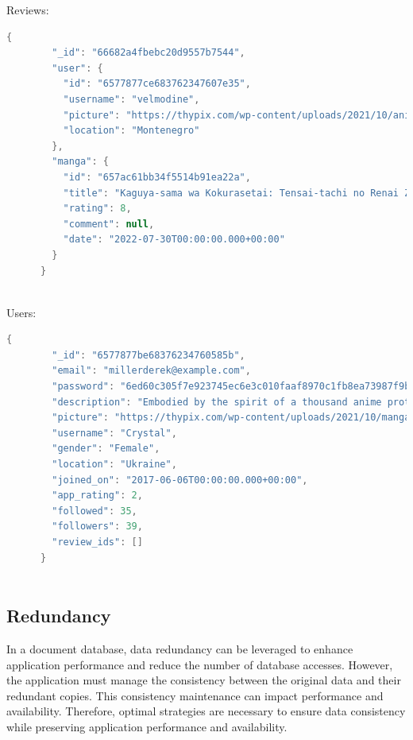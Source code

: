 \newpage

Reviews:
\begin{mdframed}[backgroundcolor=yellow!20, innerleftmargin=10pt, innerrightmargin=10pt]
    \begin{lstlisting}[language=java]
      {
        "_id": "66682a4fbebc20d9557b7544",
        "user": {
          "id": "6577877ce683762347607e35",
          "username": "velmodine",
          "picture": "https://thypix.com/wp-content/uploads/2021/10/anime-avatar-profile-pic...",
          "location": "Montenegro"
        },
        "manga": {
          "id": "657ac61bb34f5514b91ea22a",
          "title": "Kaguya-sama wa Kokurasetai: Tensai-tachi no Renai Zunousen",
          "rating": 8,
          "comment": null,
          "date": "2022-07-30T00:00:00.000+00:00"
        }
      }
      
    \end{lstlisting}
\end{mdframed}

Users:
\begin{mdframed}[backgroundcolor=yellow!20, innerleftmargin=10pt, innerrightmargin=10pt]
    \begin{lstlisting}[language=java]
      {
        "_id": "6577877be68376234760585b",
        "email": "millerderek@example.com",
        "password": "6ed60c305f7e923745ec6e3c010faaf8970c1fb8ea73987f9bf6d5ed053aa94c",
        "description": "Embodied by the spirit of a thousand anime protagonists.",
        "picture": "https://thypix.com/wp-content/uploads/2021/10/manga-profile-picture-82...",
        "username": "Crystal",
        "gender": "Female",
        "location": "Ukraine",
        "joined_on": "2017-06-06T00:00:00.000+00:00",
        "app_rating": 2,
        "followed": 35,
        "followers": 39,
        "review_ids": []
      }
      
    \end{lstlisting}
\end{mdframed}

\subsection*{Redundancy}

In a document database, data redundancy can be leveraged to enhance application performance and reduce the 
number of database accesses. However, the application must manage the consistency between the original data 
and their redundant copies. This consistency maintenance can impact performance and availability. Therefore, 
optimal strategies are necessary to ensure data consistency while preserving application performance and availability.

